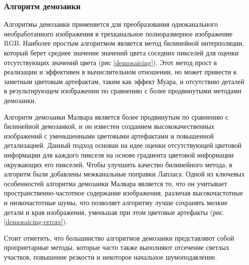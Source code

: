 \subsubsection{Алгоритм демозаики}

Алгоритмы демозаики \cite{lib-demosaic} применяется для преобразования одноканального необработанного изображения в трехканальное полноразмерное изображение RGB. Наиболее простым алгоритмом является метод билинейной интерполяции, который берет среднее значение значений цвета соседних пикселей для оценки отсутствующих значений цвета (рис \ref{demosaicing}). Этот метод прост в реализации и эффективен в вычислительном отношении, но может привести к заметным цветовым артефактам, таким как эффект Муара, и отсутствию деталей в результирующем изображении по сравнению с более продвинутыми методами демозаики.


Алгоритм демозаики Малвара является более продвинутым по сравнению с билинейной демозаикой, и он известен созданием высококачественных изображений с уменьшенными цветовыми артефактами и повышенной детализацией. Данный подход основан на идее оценки отсутствующей цветовой информации для каждого пикселя на основе градиента цветовой информации окружающих его пикселей. Чтобы улучшить качество билинейного метода, в алгоритм были добавлены межканальные поправки Лапласа. Одной из ключевых особенностей алгоритма демозаики Малвара является то, что он учитывает пространственно-частотное содержание изображения, различая высокочастотные и низкочастотные шумы, что позволяет алгоритму лучше сохранять мелкие детали и края изображения, уменьшая при этом цветовые артефакты (рис. \ref{demosaicing-errors}).


Стоит отметить, что большинство алгоритмов демозаики представляют собой проприетарные методы, которые часто также выполняют отсечение светлых участков, повышение резкости и некоторое начальное шумоподавление. 